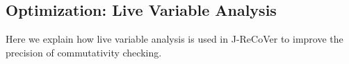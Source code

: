 \documentclass{llncs}
\newcommand{\rloop}{
	\ifmmode
	\mathbf{Loop}
	\else
	\textbf{Loop}
	\fi}
\begin{document}
% 
% 


\subsection{Optimization: Live Variable Analysis} \label{section:optimizations}

Here we explain how live variable analysis is used in J-ReCoVer to improve the precision of commutativity checking.
\end{document}
